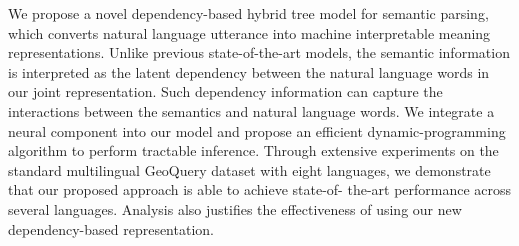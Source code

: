 We propose a novel dependency-based hybrid tree model for semantic parsing, which converts natural language utterance into machine interpretable meaning representations. Unlike previous state-of-the-art models, the semantic information is interpreted as the latent dependency between the natural language words in our joint representation. Such dependency information can capture the interactions between the semantics and natural language words. We integrate a neural component into our model and propose an efficient dynamic-programming algorithm to perform tractable inference. Through extensive experiments on the standard multilingual GeoQuery dataset with eight languages, we demonstrate that our proposed approach is able to achieve state-of- the-art performance across several languages. Analysis also justifies the effectiveness of using our new dependency-based representation.
